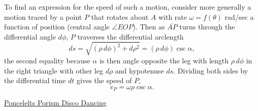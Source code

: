 \documentclass{ximera}
\begin{document}
To find an expression for the speed of such a motion, consider more generally a motion traced by a point $P$ that rotates about $A$ with rate $\omega = f(\theta)$ rad/sec a function of position (central angle $\angle EOP$). Then as $\overline{AP}$ turns through the differential angle $d\phi$, $P$ traverses the differential arclength
\[
   ds =  \sqrt{(\rho \, d\phi)^2 + d\rho^2}   =   (\rho \, d\phi) \csc \alpha ,
\]
the second equality because $\alpha$ is then angle opposite the leg with length $\rho \, d\phi$ in the right triangle with other leg $d\rho$ and hypotenuse $ds$. Dividing both sides by the differential time $dt$ gives the speed of $P$,
\[
     v_P  = \omega \rho \csc \alpha .
\]









\begin{onlineOnly}
    \begin{center}
\end{center}
\end{onlineOnly}

\href{https://www.desmos.com/calculator/owbuu0q8lz}{Poncelelts Porism Disco Dancing}

\end{document}

